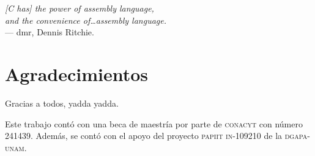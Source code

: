 
\begin{flushright}{\slshape    
    [C has] the power of assembly language,\\
and the convenience of\dots assembly language.}\\
\medskip
    --- dmr, Dennis Ritchie.
\end{flushright}



\bigskip

\begingroup
\let\clearpage\relax
\let\cleardoublepage\relax
\let\cleardoublepage\relax
\chapter*{Agradecimientos}
Gracias a todos, yadda yadda.\\

\bigskip

Este trabajo cont\'o con una beca de maestr\'ia por parte de \textsc{conacyt} con n\'umero 241439.
Adem\'as, se cont\'o con el apoyo del proyecto \textsc{papiit in-109210} de la \textsc{dgapa-unam}.
\endgroup



